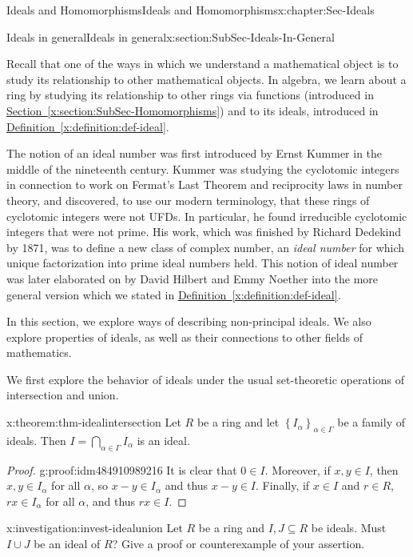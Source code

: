\documentclass[oneside,10pt,]{book}
\newcommand{\xreffont}{\relax}
\numberwithin{equation}{section}
\newcommand{\set}[1]{\left\{ {#1} \right\}}
\begin{document}
\begin{chapterptx}{Ideals and Homomorphisms}{}{Ideals and Homomorphisms}{}{}{x:chapter:Sec-Ideals}
\begin{sectionptx}{Ideals in general}{}{Ideals in general}{}{}{x:section:SubSec-Ideals-In-General}
\begin{introduction}{}
Recall that one of the ways in which we understand a mathematical object is to study its relationship to other mathematical objects. In algebra, we learn about a ring by studying its relationship to other rings via functions (introduced in \hyperref[x:section:SubSec-Homomorphisms]{Section~{\xreffont\ref{x:section:SubSec-Homomorphisms}}}) and to its ideals, introduced in \hyperref[x:definition:def-ideal]{Definition~{\xreffont\ref{x:definition:def-ideal}}}.%
\par
The notion of an ideal number was first introduced by Ernst Kummer in the middle of the nineteenth century. Kummer was studying the cyclotomic integers in connection to work on Fermat's Last Theorem and reciprocity laws in number theory, and discovered, to use our modern terminology, that these rings of cyclotomic integers were not UFDs. In particular, he found irreducible cyclotomic integers that were not prime. His work, which was finished by Richard Dedekind by 1871, was to define a new class of complex number, an \emph{ideal number} for which unique factorization into prime ideal numbers held. This notion of ideal number was later elaborated on by David Hilbert and Emmy Noether into the more general version which we stated in \hyperref[x:definition:def-ideal]{Definition~{\xreffont\ref{x:definition:def-ideal}}}.%
\par
In this section, we explore ways of describing non-principal ideals. We also explore properties of ideals, as well as their connections to other fields of mathematics.%
\end{introduction}%
We first explore the behavior of ideals under the usual set-theoretic operations of intersection and union.%
\begin{theorem}{}{}{x:theorem:thm-idealintersection}%
Let \(R\) be a ring and let \(\set{I_{\alpha}}_{\alpha\in \Gamma}\) be a family of ideals. Then \(I = \bigcap\limits_{\alpha\in \Gamma} I_\alpha\) is an ideal.%
\end{theorem}
\begin{proof}{}{g:proof:idm484910989216}
It is clear that \(0\in I\). Moreover, if \(x,y\in I\), then \(x,y\in I_\alpha\) for all \(\alpha\), so \(x-y\in I_\alpha\) and thus \(x-y\in I\). Finally, if \(x\in I\) and \(r\in R\), \(rx\in I_\alpha\) for all \(\alpha\), and thus \(rx\in I\).%
\end{proof}
\begin{investigation}{}{x:investigation:invest-idealunion}%
Let \(R\) be a ring and \(I,J\subseteq R\) be ideals. Must \(I\cup J\) be an ideal of \(R\)? Give a proof or counterexample of your assertion.%

\end{investigation}
\end{sectionptx}
\end{chapterptx}
\end{document}
